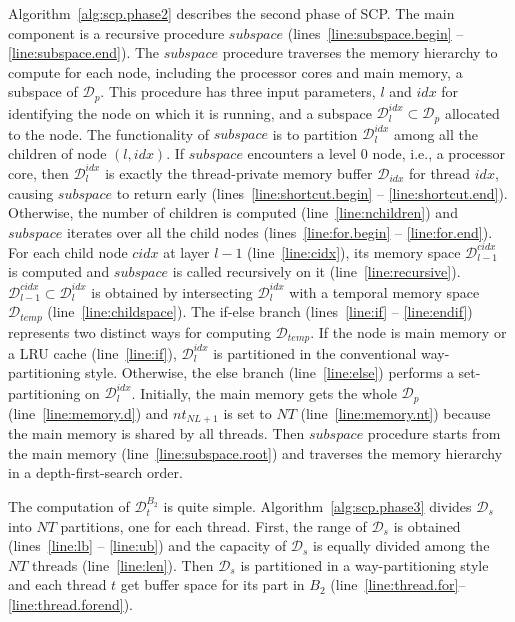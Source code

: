 Algorithm~\ref{alg:scp.phase2} describes the second phase of SCP.
The main component is a recursive procedure $subspace$
(lines~\ref{line:subspace.begin} -- \ref{line:subspace.end}).
The $subspace$ procedure traverses the memory hierarchy
to compute for each node, including the processor cores and main memory,
a subspace of $\mathcal{D}_p$.
This procedure
has three input parameters, $l$ and $idx$ for
identifying the node on which it is running,
and a subspace $\mathcal{D}_l^{idx} \subset \mathcal{D}_p$ allocated to the node. 
The functionality of $subspace$ is to partition $\mathcal{D}_l^{idx}$
among all the children of node $(l, idx)$.
If $subspace$ encounters a level 0 node, i.e., a processor core,
then $\mathcal{D}_l^{idx}$ is exactly the thread-private
memory buffer $\mathcal{D}_{idx}$ for thread $idx$,
causing $subspace$ to return early
(lines~\ref{line:shortcut.begin} -- \ref{line:shortcut.end}).
Otherwise, the number of children is computed (line~\ref{line:nchildren})
and $subspace$ iterates over all the child nodes
(lines~\ref{line:for.begin} -- \ref{line:for.end}).
For each child node $cidx$ at layer $l-1$ (line~\ref{line:cidx}),
its memory space $\mathcal{D}_{l-1}^{cidx}$ is computed
and $subspace$ is called recursively on it (line~\ref{line:recursive}).
$\mathcal{D}_{l-1}^{cidx} \subset \mathcal{D}_l^{idx}$ is obtained
by intersecting $\mathcal{D}_l^{idx}$ with
a temporal memory space $\mathcal{D}_{temp}$ (line~\ref{line:childspace}).
The if-else branch (lines~\ref{line:if} -- \ref{line:endif})
represents two distinct ways for computing
$\mathcal{D}_{temp}$.
If the node is main memory or a LRU cache (line~\ref{line:if}),
$\mathcal{D}_l^{idx}$ is partitioned in the conventional
way-partitioning style.
Otherwise, the else branch (line~\ref{line:else}) performs
a set-partitioning on $\mathcal{D}_l^{idx}$.
Initially, the main memory gets the whole $\mathcal{D}_p$ (line~\ref{line:memory.d})
and $nt_{NL+1}$ is set to $NT$ (line~\ref{line:memory.nt})
because the main memory is shared by all threads.
Then $subspace$ procedure starts from the main memory (line~\ref{line:subspace.root})
and traverses the memory hierarchy in a depth-first-search order.

The computation of $\mathcal{D}_t^{B_2}$ is quite simple.
Algorithm~\ref{alg:scp.phase3} divides $\mathcal{D}_s$
into $NT$ partitions, one for each thread.
First, the range of $\mathcal{D}_s$ is obtained
(lines~\ref{line:lb} -- \ref{line:ub}) and
the capacity of $\mathcal{D}_s$ is equally
divided among the $NT$ threads (line~\ref{line:len}).
Then $\mathcal{D}_s$ is partitioned in a way-partitioning style
and each thread $t$ get buffer space for its part in $B_2$
(line~\ref{line:thread.for}--\ref{line:thread.forend}).

